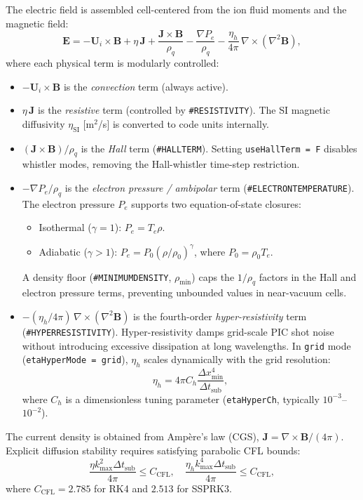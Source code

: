 \documentclass[a4paper, 11pt]{article}
\begin{document}
The electric field is assembled cell-centered from the ion fluid moments and the magnetic field:
\begin{equation}
\mathbf{E} = -\mathbf{U}_i \times \mathbf{B}
           + \eta\,\mathbf{J}
           + \frac{\mathbf{J} \times \mathbf{B}}{\rho_q}
           - \frac{\nabla P_e}{\rho_q}
           - \frac{\eta_h}{4\pi}\,\nabla \times (\nabla^2 \mathbf{B}),
\label{eq:ohmslaw}
\end{equation}
where each physical term is modularly controlled:
\begin{itemize}
  \item $-\mathbf{U}_i \times \mathbf{B}$ is the \emph{convection} term (always active).
  \item $\eta\,\mathbf{J}$ is the \emph{resistive} term (controlled by \texttt{\#RESISTIVITY}). The SI magnetic diffusivity $\eta_{\text{SI}}$ [m$^2$/s] is converted to code units internally.
  \item $(\mathbf{J}\times\mathbf{B})/\rho_q$ is the \emph{Hall} term (\texttt{\#HALLTERM}). Setting \texttt{useHallTerm = F} disables whistler modes, removing the Hall-whistler time-step restriction.
  \item $-\nabla P_e/\rho_q$ is the \emph{electron pressure / ambipolar} term (\texttt{\#ELECTRONTEMPERATURE}). The electron pressure $P_e$ supports two equation-of-state closures:
  \begin{itemize}
    \item Isothermal ($\gamma=1$): $P_e = T_e \rho$.
    \item Adiabatic ($\gamma > 1$): $P_e = P_0 (\rho/\rho_0)^\gamma$, where $P_0 = \rho_0 T_e$.
  \end{itemize}
  A density floor (\texttt{\#MINIMUMDENSITY}, $\rho_{\min}$) caps the $1/\rho_q$ factors in the Hall and electron pressure terms, preventing unbounded values in near-vacuum cells.
  \item $-(\eta_h/4\pi)\,\nabla\times(\nabla^2\mathbf{B})$ is the fourth-order \emph{hyper-resistivity} term (\texttt{\#HYPERRESISTIVITY}). Hyper-resistivity damps grid-scale PIC shot noise without introducing excessive dissipation at long wavelengths. In \texttt{grid} mode (\texttt{etaHyperMode = grid}), $\eta_h$ scales dynamically with the grid resolution:
  \begin{equation}
  \eta_h = 4\pi C_h \frac{\Delta x_{\min}^4}{\Delta t_{\text{sub}}},
  \end{equation}
  where $C_h$ is a dimensionless tuning parameter (\texttt{etaHyperCh}, typically $10^{-3}$--$10^{-2}$).
\end{itemize}
The current density is obtained from Amp\`ere's law (CGS), $\mathbf{J} = \nabla\times\mathbf{B}/(4\pi)$. Explicit diffusion stability requires satisfying parabolic CFL bounds:
\begin{equation}
\frac{\eta k_{\max}^2 \Delta t_{\text{sub}}}{4\pi} \le C_{\text{CFL}}, \quad \frac{\eta_h k_{\max}^4 \Delta t_{\text{sub}}}{4\pi} \le C_{\text{CFL}},
\end{equation}
where $C_{\text{CFL}} = 2.785$ for RK4 and $2.513$ for SSPRK3.
\end{document}
